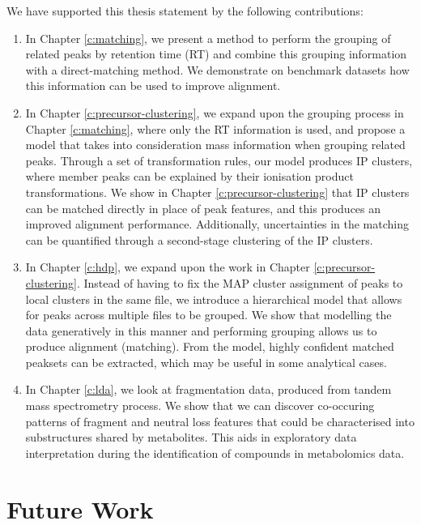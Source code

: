 We have supported this thesis statement by the following contributions:

\begin{enumerate}

\item In Chapter \ref{c:matching}, we present a method to perform the grouping of related peaks by retention time (RT) and combine this grouping information with a direct-matching method. We demonstrate on benchmark datasets how this information can be used to improve alignment. 

\item In Chapter \ref{c:precursor-clustering}, we expand upon the grouping process in Chapter \ref{c:matching}, where only the RT information is used, and propose a model that takes into consideration mass information when grouping related peaks. Through a set of transformation rules, our model produces IP clusters, where member peaks can be explained by their ionisation product transformations. We show in Chapter \ref{c:precursor-clustering} that IP clusters can be matched directly in place of peak features, and this produces an improved alignment performance. Additionally, uncertainties in the matching can be quantified through a second-stage clustering of the IP clusters.

\item In Chapter \ref{c:hdp}, we expand upon the work in Chapter \ref{c:precursor-clustering}. Instead of having to fix the MAP cluster assignment of peaks to local clusters in the same file, we introduce a hierarchical model that allows for peaks across multiple files to be grouped. We show that modelling the data generatively in this manner and performing grouping allows us to produce alignment (matching). From the model, highly confident matched peaksets can be extracted, which may be useful in some analytical cases.

\item In Chapter \ref{c:lda}, we look at fragmentation data, produced from tandem mass spectrometry process. We show that we can discover co-occuring patterns of fragment and neutral loss features that could be characterised into substructures shared by metabolites. This aids in exploratory data interpretation during the identification of compounds in metabolomics data. 

\end{enumerate}

\section{Future Work}

